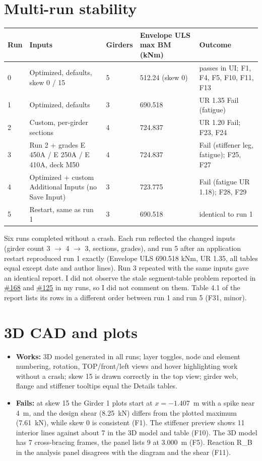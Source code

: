 \documentclass[10pt,a4paper]{article}
\begin{document}
\section{Multi-run stability}
{\small
\begin{longtable}{|p{1cm}|p{8cm}|p{2cm}|p{4cm}|p{7cm}|}
\hline \textbf{Run} & \textbf{Inputs} & \textbf{Girders} & \textbf{Envelope ULS max BM (kNm)} & \textbf{Outcome} \\ \hline \endhead
0 & Optimized, defaults, skew 0 / 15 & 5 & 512.24 (skew 0) & passes in UI; F1, F4, F5, F10, F11, F13 \\ \hline
1 & Optimized, defaults & 3 & 690.518 & UR 1.35 Fail (fatigue) \\ \hline
2 & Custom, per-girder sections & 4 & 724.837 & UR 1.20 Fail; F23, F24 \\ \hline
3 & Run 2 + grades E 450A / E 250A / E 410A, deck M50 & 4 & 724.837 & Fail (stiffener leg, fatigue); F25, F27 \\ \hline
4 & Optimized + custom Additional Inputs (no Save Input) & 3 & 723.775 & Fail (fatigue UR 1.18); F28, F29 \\ \hline
5 & Restart, same as run 1 & 3 & 690.518 & identical to run 1 \\ \hline
\end{longtable}}

Six runs completed without a crash. Each run reflected the changed inputs (girder count 3 $\rightarrow$ 4 $\rightarrow$ 3, sections, grades), and run 5 after an application restart reproduced run 1 exactly (Envelope ULS 690.518 kNm, UR 1.35, all tables equal except date and author lines). Run 3 repeated with the same inputs gave an identical report. I did not observe the stale segment-table problem reported in \href{https://github.com/Nidhikhare12/OsdagBridge/issues/168}{\#168} and \href{https://github.com/Nidhikhare12/OsdagBridge/issues/125}{\#125} in my runs, so I did not comment on them. Table 4.1 of the report lists its rows in a different order between run 1 and run 5 (F31, minor).

\section{3D CAD and plots}
\begin{itemize}[nosep]
\item \textbf{Works:} 3D model generated in all runs; layer toggles, node and element numbering, rotation, TOP/front/left views and hover highlighting work without a crash; skew 15 is drawn correctly in the top view; girder web, flange and stiffener tooltips equal the Details tables.
\item \textbf{Fails:} at skew 15 the Girder 1 plots start at $x=-1.407$~m with a spike near 4~m, and the design shear (8.25~kN) differs from the plotted maximum (7.61~kN), while skew 0 is consistent (F1). The stiffener preview shows 11 interior lines against about 7 in the 3D model and table (F10). The 3D model has 7 cross-bracing frames, the panel lists 9 at 3.000~m (F5). Reaction R\_B in the analysis panel disagrees with the diagram and the shear (F11).
\end{itemize}
\end{document}
